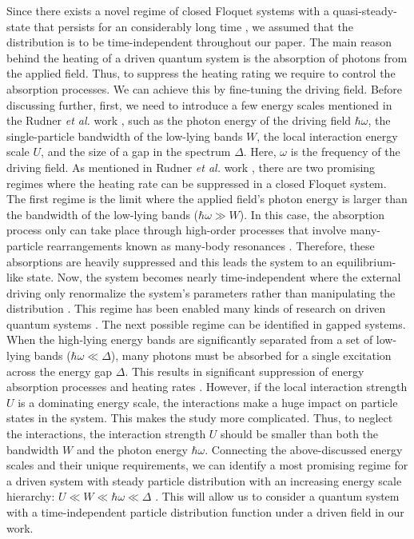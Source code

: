 \documentclass{article}
\begin{document}
Since there exists a novel regime of closed Floquet systems with a quasi-steady-state that persists for an considerably long time \cite{lindner2017}, we assumed that the distribution is to be time-independent throughout our paper. The main reason behind the heating of a driven quantum system is the absorption of photons from the applied field. Thus, to suppress the heating rating we require to control the absorption processes. We can achieve this by fine-tuning the driving field. Before discussing further, first, we need to introduce a few energy scales mentioned in the Rudner \textit{et al.} work \cite{rudner2020}, such as the photon energy of the driving field $\hbar\omega$, the single-particle bandwidth of the low-lying bands $W$, the local interaction energy scale $U$, and the size of a gap in the spectrum $\Delta$.  Here, $\omega$ is the frequency of the driving field.
As mentioned in Rudner \textit{et al.} work \cite{rudner2020}, there are two promising regimes where the heating rate can be suppressed in a closed Floquet system. The first regime is the limit where the applied field's photon energy is larger than the bandwidth of the low-lying bands ($\hbar\omega \gg W$). In this case, the absorption process only can take place through high-order processes that involve many-particle rearrangements known as many-body resonances  \cite{bukov2016,lindner2017,rudner2020}. Therefore, these absorptions are heavily suppressed and this leads the system to an equilibrium-like
state. Now, the system becomes nearly time-independent where the external driving only renormalize the system's parameters rather than manipulating the distribution \cite{wackerlthesis20}.
This regime has been enabled many kinds of research on driven quantum systems \cite{kitagawa2011,lopez2015,pervishko2015,bukov2015,yudin2016}.
The next possible regime can be identified in gapped systems. When the high-lying energy bands are significantly separated from a set of low-lying bands ($\hbar\omega \ll \Delta$), many photons must be absorbed for a single excitation across the energy gap $\Delta$. This results in significant suppression of energy absorption processes and heating rates \cite{rudner2020}. However, if the local interaction strength $U$ is a dominating energy scale, the interactions make a huge impact on particle states in the system. This makes the study more complicated. Thus, to neglect the interactions, the interaction strength $U$ should be smaller than both the bandwidth $W$ and the photon energy $\hbar\omega$. Connecting the above-discussed energy scales and their unique requirements, we can identify a most promising regime for a driven system with steady particle distribution with an increasing energy scale hierarchy: $U \ll W \ll \hbar\omega \ll \Delta$ \cite{rudner2020,wackerlthesis20}. This will allow us to consider a quantum system with a time-independent particle distribution function under a driven field in our work.
\end{document}
